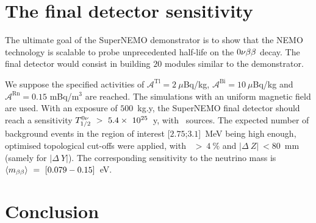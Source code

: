 
\section{The final detector sensitivity}

The ultimate goal of the SuperNEMO demonstrator is to show that the NEMO technology is scalable to probe unprecedented half-life on the $0\nu\beta\beta$ decay.
The final detector would consist in building $20$ modules similar to the demonstrator.

We suppose the specified activities of $\mathcal{A}^{\text{Tl}} = 2~\mu$Bq/kg, $\mathcal{A}^{\text{Bi}} = 10~\mu$Bq/kg and $\mathcal{A}^{\text{Rn}} = 0.15$ mBq/m$^{3}$ are reached.
The simulations with an uniform magnetic field are used.
With an exposure of $500$~kg.y, the SuperNEMO final detector should reach a sensitivity $T_{1/2}^{0\nu}~>~5.4\times~10^{25}$~y, with \Se\ sources.
The expected number of background events in the region of interest [$2.75$;$3.1$]~MeV being high enough, optimised topological cut-offs were applied, with \Pint\ $>~4~\%$ and $|\Delta~Z|~<80$~mm (samely for $|\Delta~Y|$).
The corresponding sensitivity to the neutrino mass is $\langle m_{\beta\beta}\rangle~=~[0.079-0.15]$~eV.






\section{Conclusion}

